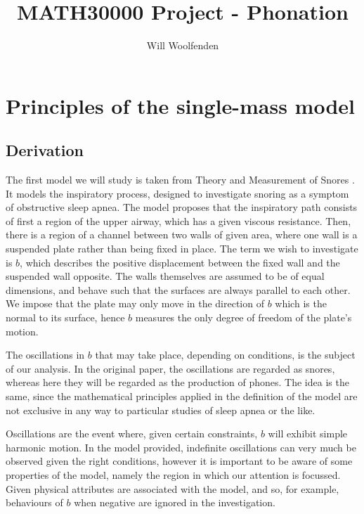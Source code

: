 \documentclass{article}
\title{MATH30000 Project - Phonation}
\author{Will Woolfenden}
\begin{document}
\maketitle



\section{Principles of the single-mass model}

\subsection{Derivation}


The first model we will study is taken from Theory and Measurement of Snores \citep{gavriely_jensen_1993}.
It models the inspiratory process, designed to investigate snoring as a symptom of obstructive sleep apnea.
The model proposes that the inspiratory path consists of first a region of the upper airway,
which has a given viscous resistance.
Then, there is a region of a channel between two walls of given area, where one wall is a suspended plate rather than being fixed in place.
The term we wish to investigate is $b$, which describes the positive displacement between the fixed wall and the suspended wall opposite.
The walls themselves are assumed to be of equal dimensions, and behave such that the surfaces are always parallel to each other.
We impose that the plate may only move in the direction of $b$ which is the normal to its surface,
hence $b$ measures the only degree of freedom of the plate's motion.


The oscillations in $b$ that may take place, depending on conditions, is the subject of our analysis.
In the original paper, the oscillations are regarded as snores,
whereas here they will be regarded as the production of phones.
The idea is the same, since the mathematical principles applied in the definition of the model are not exclusive in any way to particular studies of sleep apnea or the like.

Oscillations are the event where, given certain constraints, $b$ will exhibit simple harmonic motion. %
In the model provided, indefinite oscillations can very much be observed given the right conditions,
however it is important to be aware of some properties of the model,
namely the region in which our attention is focussed. Given physical attributes are associated with the model,
and so, for example, behaviours of $b$ when negative are ignored in the investigation.
\end{document}
